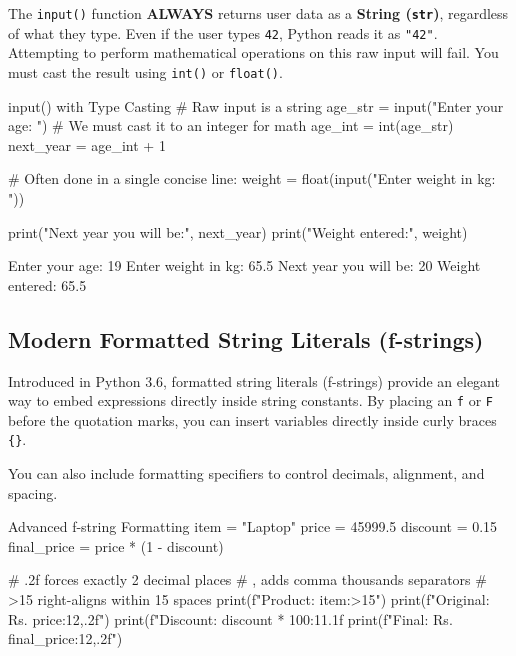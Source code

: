 \begin{conceptbox}
The \texttt{input()} function \textbf{ALWAYS} returns user data as a \textbf{String (\texttt{str})}, regardless of what they type. Even if the user types \texttt{42}, Python reads it as \texttt{"42"}. Attempting to perform mathematical operations on this raw input will fail. You must cast the result using \texttt{int()} or \texttt{float()}.
\end{conceptbox}

\begin{pythoncode}{input() with Type Casting}
# Raw input is a string
age_str = input("Enter your age: ")
# We must cast it to an integer for math
age_int = int(age_str)
next_year = age_int + 1

# Often done in a single concise line:
weight = float(input("Enter weight in kg: "))

print("Next year you will be:", next_year)
print("Weight entered:", weight)
\end{pythoncode}

\begin{outputbox}
Enter your age: 19
Enter weight in kg: 65.5
Next year you will be: 20
Weight entered: 65.5
\end{outputbox}

\subsection{Modern Formatted String Literals (f-strings)}

Introduced in Python 3.6, formatted string literals (f-strings) provide an elegant way to embed expressions directly inside string constants. By placing an \texttt{f} or \texttt{F} before the quotation marks, you can insert variables directly inside curly braces \texttt{\{\}}.

You can also include formatting specifiers to control decimals, alignment, and spacing.

\begin{pythoncode}{Advanced f-string Formatting}
item = "Laptop"
price = 45999.5
discount = 0.15
final_price = price * (1 - discount)

# .2f forces exactly 2 decimal places
# , adds comma thousands separators
# >15 right-aligns within 15 spaces
print(f"Product:  {item:>15}")
print(f"Original: Rs. {price:12,.2f}")
print(f"Discount: {discount * 100:11.1f}%
print(f"Final:    Rs. {final_price:12,.2f}")
\end{pythoncode}

